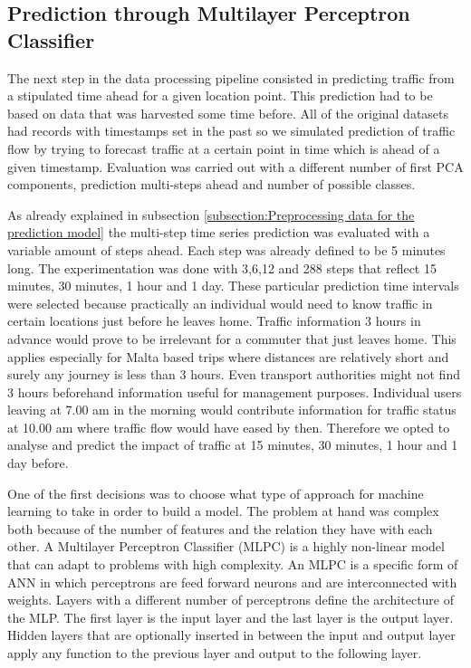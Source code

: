 \documentclass[12pt, a4paper]{report}
\theoremstyle{definition}
\theoremstyle{definition}%
\theoremstyle{definition}%
\theoremstyle{definition}%
\theoremstyle{definition}%
\theoremstyle{definition}%
\begin{document}
%



\subsection{Prediction through Multilayer Perceptron Classifier}


The next step in the data processing pipeline consisted in predicting traffic from a stipulated time ahead for a given location point. This prediction had to be based on data that was harvested some time before. All of the original datasets had records with timestamps set  in the past so we simulated prediction of traffic flow by trying to forecast traffic at a certain point in time which is ahead of a given timestamp. Evaluation was carried out with a different number of first PCA components, prediction multi-steps ahead and number of possible classes.

As already explained in subsection \ref{subsection:Preprocessing data for the prediction model} the multi-step time series prediction was evaluated with a variable amount of steps ahead. Each step was already defined to be 5 minutes long. The experimentation was done with 3,6,12 and 288 steps that reflect 15 minutes, 30 minutes, 1 hour and 1 day. These particular prediction time intervals were selected because practically an individual would need to know traffic in certain locations just before he leaves home. Traffic information 3 hours in advance would prove to be irrelevant for a commuter that just leaves home. This applies especially for Malta based trips where distances are relatively short and surely any journey is less than 3 hours. Even transport authorities might not find 3 hours beforehand information useful for management purposes. Individual users leaving at 7.00 am in the morning would contribute information for traffic status at 10.00 am where traffic flow would have eased by then. Therefore we opted to analyse and predict the impact of traffic at 15 minutes, 30 minutes, 1 hour and 1 day before.

One of the first decisions was to choose what type of approach for machine learning to take in order to build a model. The problem at hand was complex both because of the number of features and the relation they have with each other. A Multilayer Perceptron Classifier (MLPC) is a highly non-linear model that can adapt to problems with high complexity. An MLPC is a specific form of ANN in which perceptrons are feed forward neurons and are interconnected with weights. Layers with a different number of perceptrons define the architecture of the MLP. The first layer is the input layer and the last layer is the output layer. Hidden layers that are optionally inserted in between the input and output layer apply any function to the previous layer and output to the following layer.
\end{document}
